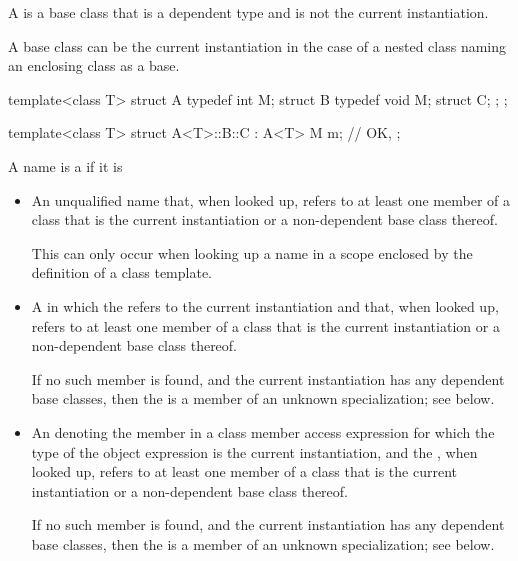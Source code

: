 \pnum
{}%
A  is a base class that is a dependent type and is
not the current instantiation.
\begin{note}
A base class can be the current instantiation in the case of a nested class
naming an enclosing class as a base.
\begin{example}
\begin{codeblock}
template<class T> struct A {
  typedef int M;
  struct B {
    typedef void M;
    struct C;
  };
};

template<class T> struct A<T>::B::C : A<T> {
  M m;                          // OK, 
};
\end{codeblock}
\end{example}
\end{note}

\pnum
{}%
A name is a
if it is

\begin{itemize}
\item
An unqualified name that, when looked up, refers to
at least one member of a class that is
the current instantiation or a non-dependent base class thereof.
\begin{note}
This can only occur when looking up a name in a scope enclosed by the
definition of a class template.
\end{note}
\item
A
in which the
refers to the current instantiation
and that, when looked up, refers to at least one member of a class that is
the current
instantiation or a non-dependent base class thereof. \begin{note} If no such
member is found, and the current instantiation has any dependent base classes,
then the  is a member of an unknown specialization;
see below. \end{note}

\item
An  denoting the member in a class member access
expression for which the type of the object expression is the
current instantiation, and the , when looked
up, refers to at least one member of a class
that is the current
instantiation or a non-dependent base class thereof. \begin{note} If no such
member is found, and the current instantiation has any dependent base classes,
then the  is a member of an unknown specialization;
see below. \end{note}
\end{itemize}

